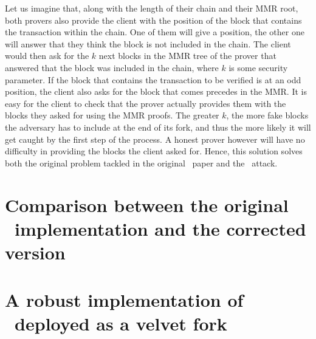     Let us imagine that, along with the length of their chain and their MMR root, both provers also provide the client with the position of the block that contains the transaction within the chain. One of them will give a position, the other one will answer that they think the block is not included in the chain. The client would then ask for the \(k\) next blocks in the MMR tree of the prover that answered that the block was included in the chain, where \(k\) is some security parameter. If the block that contains the transaction to be verified is at an odd position, the client also asks for the block that comes precedes in the MMR. It is easy for the client to check that the prover actually provides them with the blocks they asked for using the MMR proofs. The greater \(k\), the more fake blocks the adversary has to include at the end of its fork, and thus the more likely it will get caught by the first step of the process. A honest prover however will have no difficulty in providing the blocks the client asked for. Hence, this solution solves both the original problem tackled in the original \FC\ paper and the \cs\ attack.

\section{Comparison between the original \FC\ implementation and the corrected version}
    \label{section:comparison}
\section{A robust implementation of \FC\ deployed as a velvet fork}

